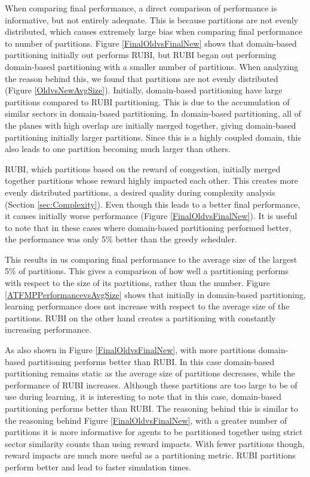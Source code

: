 \documentclass[smallcondensed]{svjour3}
\begin{document}
When comparing final performance, a direct comparison of performance is informative, but not entirely adequate. This is because partitions are not evenly distributed, which causes extremely large bias when comparing final performance to number of partitions. Figure \ref{FinalOldvsFinalNew} shows that domain-based partitioning initially out performs RUBI, but RUBI began out performing domain-based partitioning with a smaller number of partitions. When analyzing the reason behind this, we found that partitions are not evenly distributed (Figure \ref{OldvsNewAvgSize}). Initially, domain-based partitioning have large partitions compared to RUBI partitioning. This is due to the accumulation of similar sectors in domain-based partitioning. In domain-based partitioning, all of the planes with high overlap are initially merged together, giving domain-based partitioning initially larger partitions. Since this is a highly coupled domain, this also leads to one partition becoming much larger than others.

RUBI, which partitions based on the reward of congestion, initially merged together partitions whose reward highly impacted each other. This creates more evenly distributed partitions, a desired quality during complexity analysis (Section \ref{sec:Complexity}). Even though this leads to a better final performance, it causes initially worse performance (Figure \ref{FinalOldvsFinalNew}). It is useful to note that in these cases where domain-based partitioning performed better, the performance was only 5\% better than the greedy scheduler.

This results in us comparing final performance to the average size of the largest 5\% of partitions. This gives a comparison of how well a partitioning performs with respect to the size of its partitions, rather than the number. Figure \ref{ATFMPPerformancevsAvgSize} shows that initially in domain-based partitioning, learning performance does not increase with respect to the average size of the partitions. RUBI on the other hand creates a partitioning with constantly increasing performance. 

As also shown in Figure \ref{FinalOldvsFinalNew}, with more partitions domain-based partitioning performs better than RUBI. In this case domain-based partitioning remains static as the average size of partitions decreases, while the performance of RUBI increases. Although these partitions are too large to be of use during learning, it is interesting to note that in this case, domain-based partitioning performs better than RUBI. The reasoning behind this is similar to the reasoning behind Figure \ref{FinalOldvsFinalNew}, with a greater number of partitions it is more informative for agents to be partitioned together using strict sector similarity counts than using reward impacts. With fewer partitions though, reward impacts are much more useful as a partitioning metric. RUBI partitions perform better and lead to faster simulation times.
\end{document}
